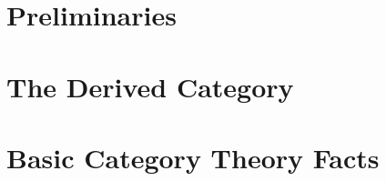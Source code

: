 \documentclass{scrreprt}
\begin{document}
    \tableofcontents

    \chapter{Preliminaries}
    

    \chapter{The Derived Category}
    

    \appendix
    \chapter{Basic Category Theory Facts}
    

    \printbibliography
\end{document}
